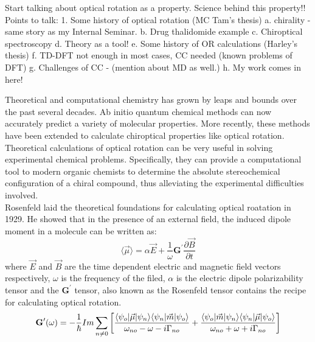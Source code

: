 
Start talking about optical rotation as a property. Science behind this property!!
Points to talk:
1. Some history of optical rotation (MC Tam's thesis)
    a. chirality - same story as my Internal Seminar.
    b. Drug thalidomide example
    c. Chiroptical spectroscopy
    d. Theory as a tool!
    e. Some history of OR calculations (Harley's thesis)
    f. TD-DFT not enough in most cases, CC needed (known problems of DFT)
    g. Challenges of CC - (mention about MD as well.)
    h. My work comes in here!


Theoretical and computational chemistry has grown by leaps and bounds over the
past several decades. Ab initio quantum chemical methods can now accurately
predict a variety of molecular properties. More recently, these methods have
been extended to calculate chiroptical
properties like optical rotation. Theoretical calculations of optical rotation
can be very useful in solving experimental chemical problems.  Specifically, they
can provide a computational tool to modern organic chemists to determine
the absolute stereochemical configuration of a chiral compound, thus alleviating the experimental difficulties
involved.\\ Rosenfeld laid the theoretical foundations for calculating optical
roatation in 1929\cite{Rosenfeld29}. He showed that in the presence of an
external field, the induced dipole moment in a molecule can be written as:
\begin{equation}\langle\vec{\mu}\rangle = \alpha\vec{E} + \frac{1}{\omega}\textbf{G}^\prime\frac{\partial\vec{B}}{\partial t}
\end{equation} where $\vec{E} $ and $\vec{B}$ are the time dependent electric and
magnetic field vectors respectively, $\omega$ is the frequency of the filed, $\alpha$ is the electric dipole
polarizability tensor and the $\textbf{G}^\prime$ tensor, also known as the Rosenfeld
tensor contains the recipe for calculating optical rotation.
\begin{equation}
\textbf{G}^{\prime}(\omega) = -\frac{1}{\hbar} Im\sum_{n \neq 0}\left[\frac{\langle \psi_o |\vec{\mu}| \psi_n \rangle\langle \psi_n |\vec{m}| \psi_o \rangle}{\omega_{no} - \omega - i\Gamma_{no}} + \frac{\langle \psi_o |\vec{m}| \psi_n \rangle\langle \psi_n |\vec{\mu}| \psi_o \rangle}{\omega_{no} + \omega + i\Gamma_{no}} \right]
\end{equation}

